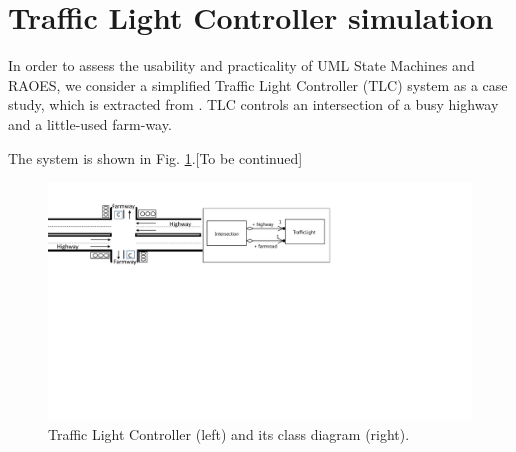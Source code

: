 \section{Traffic Light Controller simulation}
\label{sec:casestudy}
In order to assess the usability and practicality of UML State Machines and RAOES, we consider a simplified Traffic Light Controller (TLC) system as a case study, which is extracted from \cite{katz2005contemporary}.
TLC controls an intersection of a busy highway and a little-used farm-way.

The system is shown in Fig. \ref{fig:casestudy}.[To be continued]

\begin{figure}
	\centering
	\includegraphics[clip, trim=0.6cm 12.5cm 10.9cm 1.8cm, width=1.0\columnwidth]{figures/casestudy}
	\caption{Traffic Light Controller (left) and its class diagram (right).} 
	\label{fig:casestudy}
\end{figure}






